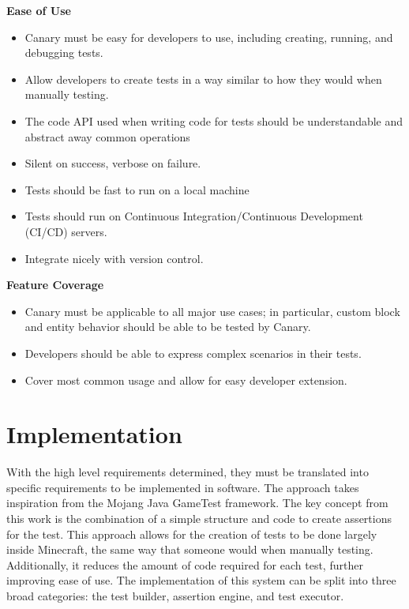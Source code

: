 \documentclass[12pt]{article}
\begin{document}
\begin{onehalfspacing}
\textbf{Ease of Use}

\begin{itemize}
\item
  Canary must be easy for developers to use, including creating,
  running, and debugging tests.
\item
  Allow developers to create tests in a way similar to how they would
  when manually testing.
\item
  The code API used when writing code for tests should be understandable
  and abstract away common operations
\item
  Silent on success, verbose on failure.
\item
  Tests should be fast to run on a local machine
\item
  Tests should run on Continuous Integration/Continuous Development
  (CI/CD) servers.
\item
  Integrate nicely with version control.
\end{itemize}

\textbf{Feature Coverage}

\begin{itemize}
\item
  Canary must be applicable to all major use cases; in particular,
  custom block and entity behavior should be able to be tested by
  Canary.
\item
  Developers should be able to express complex scenarios in their tests.
\item
  Cover most common usage and allow for easy developer extension.
\end{itemize}

\section{Implementation}

With the high level requirements determined, they must be translated
into specific requirements to be implemented in software. The approach
takes inspiration from the Mojang Java GameTest framework. The key
concept from this work is the combination of a simple structure and code
to create assertions for the test. This approach allows for the creation
of tests to be done largely inside Minecraft, the same way that someone
would when manually testing. Additionally, it reduces the amount of code
required for each test, further improving ease of use. The
implementation of this system can be split into three broad categories:
the test builder, assertion engine, and test executor.


\end{onehalfspacing}
\end{document}
